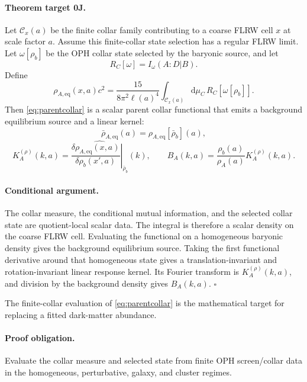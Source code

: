 \documentclass[11pt]{article}
\newcommand{\dd}{\mathrm{d}}
\begin{document}
\paragraph{Theorem target 0J.}
Let \(\mathcal C_x(a)\) be the finite collar family contributing to a coarse
FLRW cell \(x\) at scale factor \(a\).  Assume this finite-collar state
selection has a regular FLRW limit.  Let \(\omega[\rho_b]\) be the OPH collar
state selected by the baryonic source, and let
\begin{equation}
  R_C[\omega]=I_\omega(A:D|B).
\end{equation}
Define
\begin{equation}
  \rho_{A,\mathrm{eq}}(x,a)c^2
  =
  \frac{15}{8\pi^2\ell(a)^4}
  \int_{\mathcal C_x(a)}\dd\mu_C\,
  R_C[\omega[\rho_b]].
  \label{eq:parentcollar}
\end{equation}
Then \eqref{eq:parentcollar} is a scalar parent collar functional that emits a
background equilibrium source and a linear kernel:
\begin{equation}
  \bar\rho_{A,\mathrm{eq}}(a)=
  \rho_{A,\mathrm{eq}}[\bar\rho_b](a),
\end{equation}
\begin{equation}
  K_A^{(\rho)}(k,a)=
  \widehat{
  \left.
  \frac{\delta\rho_{A,\mathrm{eq}}(x,a)}
       {\delta\rho_b(x',a)}
  \right|_{\bar\rho_b}
  }(k),
  \qquad
  B_A(k,a)=\frac{\rho_b(a)}{\rho_A(a)}K_A^{(\rho)}(k,a).
\end{equation}

\paragraph{Conditional argument.}
The collar measure, the conditional mutual information, and the selected
collar state are quotient-local scalar data.  The integral is therefore a
scalar density on the coarse FLRW cell.  Evaluating the functional on a
homogeneous baryonic density gives the background equilibrium source.  Taking
the first functional derivative around that homogeneous state gives a
translation-invariant and rotation-invariant linear response kernel.  Its
Fourier transform is \(K_A^{(\rho)}(k,a)\), and division by the background density gives
\(B_A(k,a)\). \(\square\)

The finite-collar evaluation of \eqref{eq:parentcollar} is the mathematical
target for replacing a fitted dark-matter abundance.

\paragraph{Proof obligation.}
Evaluate the collar measure and selected state from finite OPH screen/collar
data in the homogeneous, perturbative, galaxy, and cluster regimes.
\end{document}
